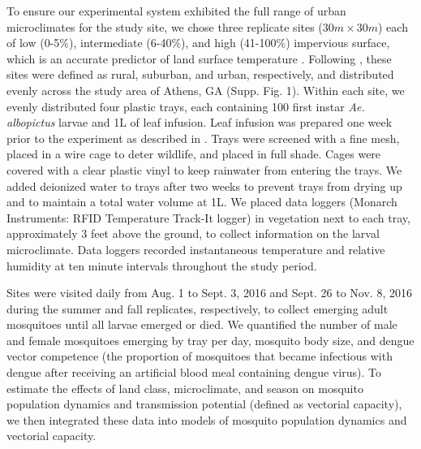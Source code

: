 \documentclass[12pt]{article}
\begin{document}
To ensure our experimental system exhibited the full range of urban microclimates for the study site, we chose three replicate sites ($30m \times 30m$) each of low (0-5\%), intermediate (6-40\%), and high (41-100\%) impervious surface, which is an accurate predictor of land surface temperature \citep{yuan2007}. Following \citet{murdock2017}, these sites were defined as rural, suburban, and urban, respectively, and distributed evenly across the study area of Athens, GA (Supp. Fig. 1). Within each site, we evenly distributed four plastic trays, each containing 100 first instar \textit{Ae. albopictus} larvae and 1L of leaf infusion. Leaf infusion was prepared one week prior to the experiment as described in \citet{murdock2017}.  Trays were screened with a fine mesh, placed in a wire cage to deter wildlife, and placed in full shade. Cages were covered with a clear plastic vinyl to keep rainwater from entering the trays. We added deionized water to trays after two weeks to prevent trays from drying up and to maintain a total water volume at 1L. We placed data loggers (Monarch Instruments: RFID Temperature Track-It logger) in vegetation next to each tray, approximately 3 feet above the ground, to collect information on the larval microclimate. Data loggers recorded instantaneous temperature and relative humidity at ten minute intervals throughout the study period.


Sites were visited daily from Aug. 1 to Sept. 3, 2016 and Sept. 26 to Nov. 8, 2016 during the summer and fall replicates, respectively, to collect emerging adult mosquitoes until all larvae emerged or died. We quantified the number of male and female mosquitoes emerging by tray per day, mosquito body size, and dengue vector competence (the proportion of mosquitoes that became infectious with dengue after receiving an artificial blood meal containing dengue virus). To estimate the effects of land class, microclimate, and season on mosquito population dynamics and transmission potential (defined as vectorial capacity), we then integrated these data into models of mosquito population dynamics and vectorial capacity.
\end{document}

